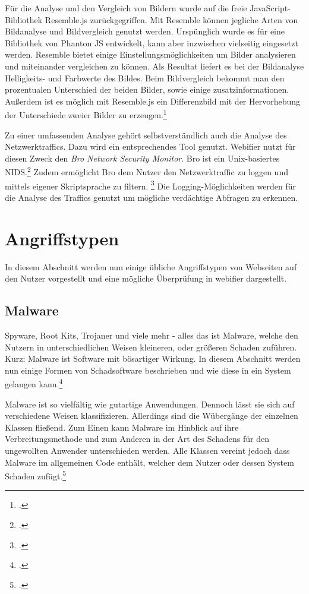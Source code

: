 Für die Analyse und den Vergleich von Bildern wurde auf die freie JavaScript-Bibliothek Resemble.js zurückgegriffen. Mit Resemble können jegliche Arten von Bildanalyse und Bildvergleich genutzt werden. Urspünglich wurde es für eine Bibliothek von Phanton JS entwickelt, kann aber inzwischen vielseitig eingesetzt werden. Resemble bietet einige Einstellungsmöglichkeiten um Bilder analysieren und miteinander vergleichen zu können. Als Resultat liefert es bei der Bildanalyse Helligkeits- und Farbwerte des Bildes. Beim Bildvergleich bekommt man den prozentualen Unterschied der beiden Bilder, sowie einige zusatzinformationen. Außerdem ist es möglich mit Resemble.js ein Differenzbild mit der Hervorhebung der Unterschiede zweier Bilder zu erzeugen.\footcite[Vgl.][]{resemblejs}

Zu einer umfassenden Analyse gehört selbstverständlich auch die Analyse des Netzwerktraffics. Dazu wird ein entsprechendes Tool genutzt. Webifier nutzt für diesen Zweck den \textit{Bro Network Security Monitor}. Bro ist ein Unix-basiertes \ac{NIDS}.\footcite[Vgl.][199]{bro} Zudem ermöglicht Bro dem Nutzer den Netzwerktraffic zu loggen und mittels eigener Skriptsprache zu filtern. \footcite{bro2} Die Logging-Möglichkeiten werden für die Analyse des Traffics genutzt um mögliche verdächtige Abfragen zu erkennen.


\section{Angriffstypen}

In diesem Abschnitt werden nun einige übliche Angriffstypen von Webseiten auf den Nutzer vorgestellt und eine mögliche Überprüfung in webifier dargestellt.


\subsection{Malware}

Spyware, Root Kits, Trojaner und viele mehr - alles das ist Malware, welche den Nutzern in unterschiedlichen Weisen kleineren, oder größeren Schaden zuführen. Kurz: Malware ist Software mit bösartiger Wirkung. In diesem Abschnitt werden nun einige Formen von Schadsoftware beschrieben und wie diese in ein System gelangen kann.\footcite[Vgl.][95]{netzwerkDatensicherheit}

Malware ist so vielfältig wie gutartige Anwendungen. Dennoch lässt sie sich auf verschiedene Weisen klassifizieren. Allerdings sind die Wübergänge der einzelnen Klassen fließend. Zum Einen kann Malware im Hinblick auf ihre Verbreitungsmethode und zum Anderen in der Art des Schadens für den ungewollten Anwender unterschieden werden. Alle Klassen vereint jedoch dass Malware im allgemeinen Code enthält, welcher dem Nutzer oder dessen System Schaden zufügt.\footcite[Vgl.][95\psq]{netzwerkDatensicherheit}

